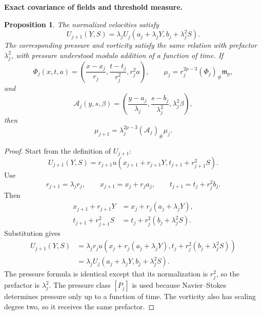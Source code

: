 \documentclass[11pt]{article}
\newtheorem{proposition}[theorem]{Proposition}
\theoremstyle{definition}\newtheorem{definition}[theorem]{Definition}
\theoremstyle{remark}\newtheorem{remark}[theorem]{Remark}
\begin{document}
\medskip
\noindent\textbf{Exact covariance of fields and threshold measure.}
\begin{proposition}\label{prop:renorm-covariance}
The normalized velocities satisfy
\[
\boxed{
U_{j+1}(Y,S)=\lambda_jU_j(a_j+\lambda_jY,b_j+\lambda_j^2S).
}
\]
The corresponding pressure and vorticity satisfy the same relation with
prefactor $\lambda_j^2$, with pressure understood modulo addition of a
function of time.  If
\[
\Phi_j(x,t,a)=\left(\frac{x-x_j}{r_j},\frac{t-t_j}{r_j^2},r_j^2a\right),
\qquad
\mu_j=r_j^{2p-3}(\Phi_j)_\#\mathfrak m_p,
\]
and
\[
\mathcal A_j(y,s,\beta)
=\left(\frac{y-a_j}{\lambda_j},\frac{s-b_j}{\lambda_j^2},\lambda_j^2\beta\right),
\]
then
\[
\boxed{
\mu_{j+1}=\lambda_j^{2p-3}(\mathcal A_j)_\#\mu_j.
}
\]
\end{proposition}
\begin{proof}
Start from the definition of $U_{j+1}$:
\[
U_{j+1}(Y,S)
=r_{j+1}u(x_{j+1}+r_{j+1}Y,t_{j+1}+r_{j+1}^2S).
\]
Use
\[
r_{j+1}=\lambda_jr_j,
\qquad
x_{j+1}=x_j+r_ja_j,
\qquad
t_{j+1}=t_j+r_j^2b_j.
\]
Then
\[
\begin{aligned}
x_{j+1}+r_{j+1}Y
&=x_j+r_j(a_j+\lambda_jY),\\
t_{j+1}+r_{j+1}^2S
&=t_j+r_j^2(b_j+\lambda_j^2S).
\end{aligned}
\]
Substitution gives
\[
\begin{aligned}
U_{j+1}(Y,S)
&=\lambda_jr_j
u\!\left(x_j+r_j(a_j+\lambda_jY),
 t_j+r_j^2(b_j+\lambda_j^2S)\right)\\
&=\lambda_jU_j(a_j+\lambda_jY,b_j+\lambda_j^2S).
\end{aligned}
\]
The pressure formula is identical except that its normalization is $r_j^2$,
so the prefactor is $\lambda_j^2$.  The pressure class $[P_j]$ is used because
Navier--Stokes determines pressure only up to a function of time.  The
vorticity also has scaling degree two, so it receives the same prefactor.


\end{proof}
\end{document}
